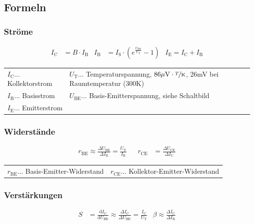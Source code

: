 	\subsection{Formeln}
		\subsubsection{Ströme}
			\begin{align*}
				I_{\mathrm{C}}&=B\cdot I_{\mathrm{B}} 
				& I_{\mathrm{B}}&=I_{\mathrm{S}}\cdot\left(e^{\frac{U_{\mathrm{BE}}}{U_{\mathrm{T}}}}-1\right) 
				& I_{\mathrm{E}}=I_{\mathrm{C}}+I_{\mathrm{B}} 
			\end{align*}
			\begin{table}[h]
			\begin{tabular}{ll}
			$I_{\mathrm{C}}\dots$ Kollektorstrom & $U_{\mathrm{T}}\dots$ Temperaturspannung, $86\mu\mathrm{V}\cdot\nicefrac{T}{\mathrm{K}}$, 26mV bei Raumtemperatur (300K)\\
			$I_{\mathrm{B}}\dots$ Basisstrom & $U_{\mathrm{BE}}\dots$ Basis-Emitterspannung, siehe Schaltbild
\\
			$I_{\mathrm{E}}\dots$ Emitterstrom & \\
			\end{tabular}
			\end{table}

		\subsubsection{Widerstände}
			\begin{align*}
				r_{\mathrm{BE}}\approx\frac{\Delta U_{\mathrm{BE}}}{\Delta I_{\mathrm{B}}}=\frac{U_{\mathrm{T}}}{I_{\mathrm{B}}} 
				&& r_{\mathrm{CE}}&=\frac{\Delta U_{\mathrm{CE}}}{\Delta I_{\mathrm{C}}}
			\end{align*}
			\begin{table}[h]
			\begin{tabular}{ll}
			$r_{\mathrm{BE}}\dots$ Basis-Emitter-Widerstand & $r_{\mathrm{CE}}\dots$ Kollektor-Emitter-Widerstand\\
			\end{tabular}
			\end{table}

		\subsubsection{Verstärkungen}
			\begin{align*}
				S&=\frac{\mathrm{d}I_{\mathrm{C}}}{\mathrm{d}U_{\mathrm{BE}}}\approx\frac{\Delta I_{\mathrm{C}}}{\Delta U_{\mathrm{BE}}}=\frac{I_{\mathrm{C}}}{U_{\mathrm{T}}} 
				& \beta\approx\frac{\Delta I_{\mathrm{C}}}{\Delta I_{\mathrm{B}}}
			\end{align*}
		
